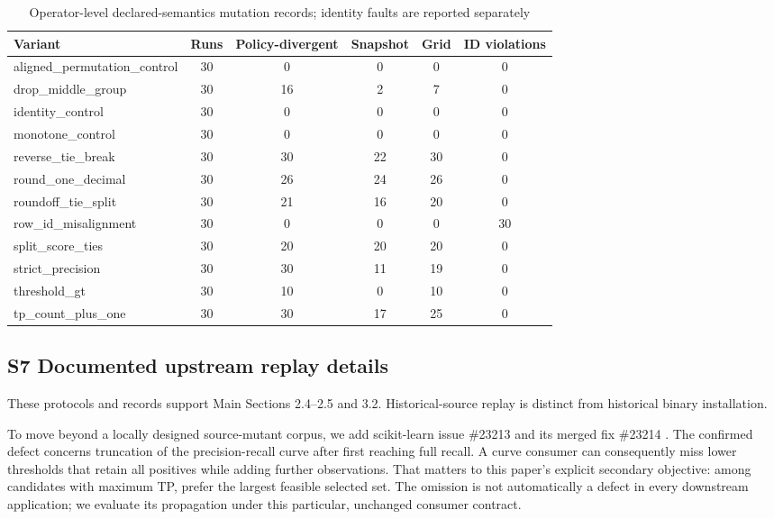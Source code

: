 \documentclass[11pt,a4paper]{article}
\theoremstyle{plain}
\theoremstyle{definition}
\theoremstyle{remark}
\begin{document}
\begin{table}[!htbp]
\caption{Operator-level declared-semantics mutation records; identity faults are reported separately}\label{tab:s2}
\centering
\footnotesize
\setlength{\tabcolsep}{3pt}
\renewcommand{\arraystretch}{1.15}
\begin{tabularx}{\textwidth}{@{} >{\raggedright\arraybackslash}X c c c c c @{}}
\toprule
\textbf{Variant} & \textbf{Runs} & \textbf{Policy-divergent} & \textbf{Snapshot} & \textbf{Grid} & \textbf{ID violations} \\
\midrule
aligned\_permutation\_control & 30 & 0 & 0 & 0 & 0 \\
drop\_middle\_group & 30 & 16 & 2 & 7 & 0 \\
identity\_control & 30 & 0 & 0 & 0 & 0 \\
monotone\_control & 30 & 0 & 0 & 0 & 0 \\
reverse\_tie\_break & 30 & 30 & 22 & 30 & 0 \\
round\_one\_decimal & 30 & 26 & 24 & 26 & 0 \\
roundoff\_tie\_split & 30 & 21 & 16 & 20 & 0 \\
row\_id\_misalignment & 30 & 0 & 0 & 0 & 30 \\
split\_score\_ties & 30 & 20 & 20 & 20 & 0 \\
strict\_precision & 30 & 30 & 11 & 19 & 0 \\
threshold\_gt & 30 & 10 & 0 & 10 & 0 \\
tp\_count\_plus\_one & 30 & 30 & 17 & 25 & 0 \\
\bottomrule
\end{tabularx}
\end{table}
\FloatBarrier


\subsection*{S7 Documented upstream replay details}\label{sec:s7}

These protocols and records support Main Sections 2.4--2.5 and 3.2. Historical-source replay is distinct from historical binary installation.

To move beyond a locally designed source-mutant corpus, we add scikit-learn issue \#23213 \cite{sklearn_issue23213} and its merged fix \#23214 \cite{sklearn_pr23214}. The confirmed defect concerns truncation of the precision-recall curve after first reaching full recall. A curve consumer can consequently miss lower thresholds that retain all positives while adding further observations. That matters to this paper's explicit secondary objective: among candidates with maximum TP, prefer the largest feasible selected set. The omission is not automatically a defect in every downstream application; we evaluate its propagation under this particular, unchanged consumer contract.
\end{document}
